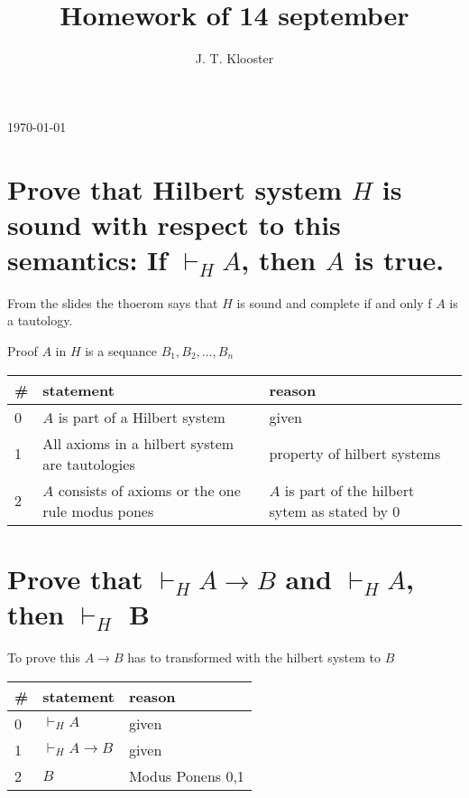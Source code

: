 \documentclass{article}
\begin{document}
\author{J. T. Klooster}
\title{Homework of 14 september}
\maketitle
\today
\section{Prove that Hilbert system $H$ is sound with respect to this
semantics: If $\vdash_H A$, then $A$ is true.}

From the slides the thoerom says that $H$ is sound and complete
if and only f $A$ is a tautology.

Proof $A$ in $H$ is a sequance $B_1, B_2, \ldots, B_n$

\begin{tabular}{@{}l|ll@{}}
\#& statement			&reason \\ \toprule
0& $A$ is part of a Hilbert system & given \\
1& All axioms in a hilbert system are tautologies & property of hilbert systems\\
2& $A$ consists of axioms or the one rule modus pones & $A$ is part of the hilbert sytem as stated by $0$ \\
\end{tabular}


\section{Prove that $\vdash_H A \to B$ and $\vdash_H A$, then $\vdash_H$ B}
To prove this $A \to B$ has to transformed with the hilbert system to $B$

\begin{tabular}{@{}l|ll@{}}
\#& statement			&reason \\ \toprule
0& $\vdash_H A$ & given \\
1& $\vdash_H A \to B$ & given \\
2& $B$ & Modus Ponens 0,1 \\
\end{tabular}
\end{document}
